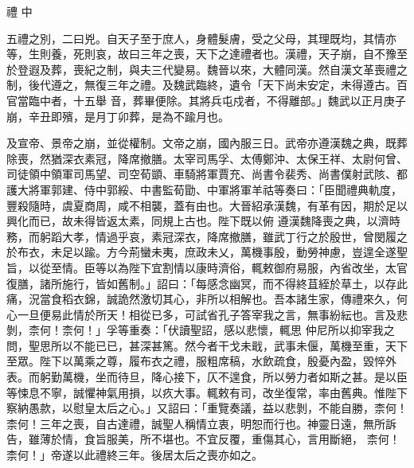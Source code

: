 
\begin{pinyinscope}

 禮
 中



 五禮之別，二曰兇。自天子至于庶人，身體髮膚，受之父母，其理既均，其情亦等，生則養，死則哀，故曰三年之喪，天下之達禮者也。漢禮，天子崩，自不豫至於登遐及葬，喪紀之制，與夫三代變易。魏晉以來，大體同漢。然自漢文革喪禮之制，後代遵之，無復三年之禮。及魏武臨終，遺令「天下尚未安定，未得遵古。百官當臨中者，十五舉
 音，葬畢便除。其將兵屯戍者，不得離部。」魏武以正月庚子崩，辛丑即殯，是月丁卯葬，是為不踰月也。



 及宣帝、景帝之崩，並從權制。文帝之崩，國內服三日。武帝亦遵漢魏之典，既葬除喪，然猶深衣素冠，降席撤膳。太宰司馬孚、太傅鄭沖、太保王祥、太尉何曾、司徒領中領軍司馬望、司空荀顗、車騎將軍賈充、尚書令裴秀、尚書僕射武陔、都護大將軍郭建、侍中郭綏、中書監荀勖、中軍將軍羊祜等奏曰：「臣聞禮典軌度，豐殺隨時，虞夏商周，咸不相襲，蓋有由也。大晉紹承漢魏，有革有因，期於足以興化而已，故未得皆返太素，同規上古也。陛下既以俯
 遵漢魏降喪之典，以濟時務，而躬蹈大孝，情過乎哀，素冠深衣，降席撤膳，雖武丁行之於殷世，曾閔履之於布衣，未足以踰。方今荊蠻未夷，庶政未乂，萬機事殷，動勞神慮，豈遑全遂聖旨，以從至情。臣等以為陛下宜割情以康時濟俗，輒敕御府易服，內省改坐，太官復膳，諸所施行，皆如舊制。」詔曰：「每感念幽冥，而不得終苴絰於草土，以存此痛，況當食稻衣錦，誠詭然激切其心，非所以相解也。吾本諸生家，傳禮來久，何心一旦便易此情於所天！相從已多，可試省孔子答宰我之言，無事紛紜也。言及悲剝，柰何！柰何！」孚等重奏：「伏讀聖詔，感以悲懷，輒思
 仲尼所以抑宰我之問，聖思所以不能已已，甚深甚篤。然今者干戈未戢，武事未偃，萬機至重，天下至眾。陛下以萬乘之尊，履布衣之禮，服粗席稿，水飲疏食，殷憂內盈，毀悴外表。而躬勤萬機，坐而待旦，降心接下，仄不遑食，所以勞力者如斯之甚。是以臣等悚息不寧，誠懼神氣用損，以疚大事。輒敕有司，改坐復常，率由舊典。惟陛下察納愚款，以慰皇太后之心。」又詔曰：「重覽奏議，益以悲剝，不能自勝，柰何！柰何！三年之喪，自古達禮，誠聖人稱情立衷，明恕而行也。神靈日遠，無所訴告，雖薄於情，食旨服美，所不堪也。不宜反覆，重傷其心，言用斷絕，
 柰何！柰何！」帝遂以此禮終三年。後居太后之喪亦如之。




\end{pinyinscope}
